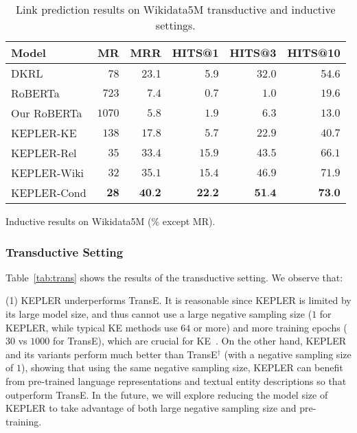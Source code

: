 \begin{table*}[t]
		\begin{subtable}[h]{0.98\textwidth}
	\centering
	\begin{tabular}{lrrrrr}
		\toprule
		\textbf{Model} & \textbf{MR} & \textbf{MRR} & \textbf{HITS@1} & \textbf{HITS@3} & \textbf{HITS@10}\\
		\midrule
		DKRL \citep{Xie:2016:RLK:3016100.3016273} & 78 & 23.1 & 5.9 & 32.0 & 54.6\\
		RoBERTa & $723$ & $7.4$ & $0.7$ & $1.0$ & $19.6$ \\
		Our RoBERTa & $1070$ & $5.8$ & $1.9$ & $6.3$ & $13.0$ \\
		KEPLER-KE & $138$ & $17.8$ & $5.7$ & $22.9$ & $40.7$ \\
		KEPLER-Rel & $35$ & $33.4$ & $15.9$ & $43.5$ & $66.1$ \\
		KEPLER-Wiki & $32$ & $35.1$ & $15.4$ & $46.9$ & $71.9$ \\
		KEPLER-Cond & $\textbf{28}$ & $\textbf{40.2}$ & $\textbf{22.2}$ & $\textbf{51.4}$ & $\textbf{73.0}$ \\
		\bottomrule
	\end{tabular}
	\caption{Inductive results on Wikidata5M (\% except MR).}
	\label{tab:induct}
	\end{subtable}
	\caption{Link prediction results on Wikidata5M transductive and inductive settings. }
	\label{tab:keplerkg}
\end{table*}


\subsubsection*{Transductive Setting}




Table~\ref{tab:trans} shows the results of the transductive setting. We observe that: 

(1) KEPLER underperforms TransE. It is reasonable since KEPLER is limited by its large model size, and thus cannot use a large negative sampling size ($1$ for KEPLER, while typical KE methods use $64$ or more) and more training epochs ($30$ vs $1000$ for TransE), which are crucial for KE~\citep{zhu2019graphvite}. On the other hand, KEPLER and its variants perform much better than TransE$^\dagger$ (with a negative sampling size of $1$), showing that using the same negative sampling size, KEPLER can benefit from pre-trained language representations and textual entity descriptions so that outperform TransE. In the future, we will explore reducing the model size of KEPLER to take advantage of both large negative sampling size and pre-training.

